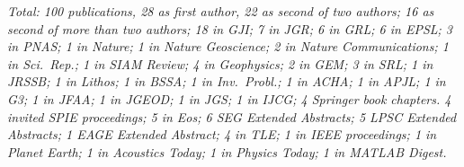 \documentclass[12pt]{article}
\begin{document}
\emph{Total: 100 publications,
28 as first author,
22 as second of two authors;
16 as second of more than two authors;
18 in \emph{GJI};
7 in \emph{JGR};
6 in \emph{GRL};
6 in \emph{EPSL};
3 in \emph{PNAS};
1 in \emph{Nature};
1 in \emph{Nature Geoscience};
2 in \emph{Nature Communications};
1 in \emph{Sci.~Rep.};
1 in \emph{SIAM Review};
4 in \emph{Geophysics};
2 in \emph{GEM};
3 in \emph{SRL};
1 in \emph{JRSSB};
1 in \emph{Lithos};
1 in \emph{BSSA};
1 in \emph{Inv.~Probl.};
1 in \emph{ACHA};
1 in \emph{APJL};
1 in \emph{G3};
1 in \emph{JFAA};
1 in \emph{JGEOD};
1 in \emph{JGS};
1 in \emph{IJCG};
4 \emph{Springer} book chapters.
4 invited \emph{SPIE} proceedings;
5 in \emph{Eos};
6 \emph{SEG Extended Abstracts};
5 \emph{LPSC Extended Abstracts};
1 \emph{EAGE Extended Abstract};
4 in \emph{TLE};
1 in \emph{IEEE} proceedings;
1 in \emph{Planet Earth};
1 in \emph{Acoustics Today};
1 in \emph{Physics Today};
1 in \emph{MATLAB Digest}.}

\nocite{Bevis+2019,Dahlen+2008,Guillaumin+2022,Gualtieri+2020,Harig+2012,Harig+2015a,Kopp+2009,Nolet+2019,Pipatprathanporn+2022,Plattner+2014a,Plattner+2017a,Reuber+2020,Simon+2022,Simons+99,Simons+2003a,Simons+2006a,Simons+2006b,Simons+2009a,Simons+2011b,Simons+2013,Simons2010,Sukhovich+2015,Wang+2012a,Yuan+2014a,Yuan+2015}



\end{document}
